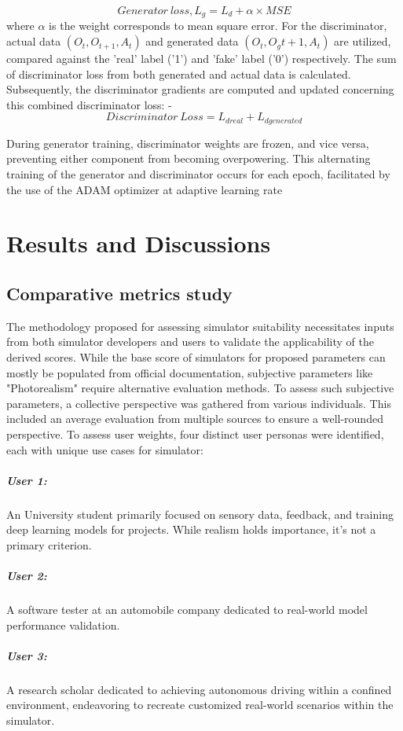 \documentclass[12pt,twoside,a4paper,parskip]{scrbook} %
\begin{document}
\[Generator\ loss, L_g = L_d + \alpha \times MSE\]
where $\alpha$ is the weight corresponds to mean square error. 
For the discriminator, actual data \((O_t, O_{t+1}, A_t)\) and generated data \((O_t, O_g{t+1}, A_t)\) are utilized, compared against the 'real' label ('1') and 'fake' label ('0') respectively. The sum of discriminator loss from both generated and actual data is calculated. Subsequently, the discriminator gradients are computed and updated concerning this combined discriminator loss:
-
\[Discriminator\ Loss = L_{d real} + L_{d generated}\]

During generator training, discriminator weights are frozen, and vice versa, preventing either component from becoming overpowering. This alternating training of the generator and discriminator occurs for each epoch, facilitated by the use of the ADAM optimizer at adaptive learning rate
\chapter{Results and Discussions}
\section{Comparative metrics study}
The methodology proposed for assessing simulator suitability necessitates inputs from both simulator developers and users to validate the applicability of the derived scores. While the base score of simulators for proposed parameters can mostly be populated from official documentation, subjective parameters like "Photorealism" require alternative evaluation methods. To assess such subjective parameters, a collective perspective was gathered from various individuals. This included an average evaluation from multiple sources to ensure a well-rounded perspective. 
To assess user weights, four distinct user personas were identified, each with unique use cases for simulator:
\paragraph*{User 1: }  An University student primarily focused on sensory data, feedback, and training deep learning models for projects. While realism holds importance, it's not a primary criterion.
\paragraph*{User 2: } A software tester at an automobile company dedicated to real-world model performance validation.
\paragraph*{User 3: } A research scholar dedicated to achieving autonomous driving within a confined environment, endeavoring to recreate customized real-world scenarios within the simulator.
\end{document}
